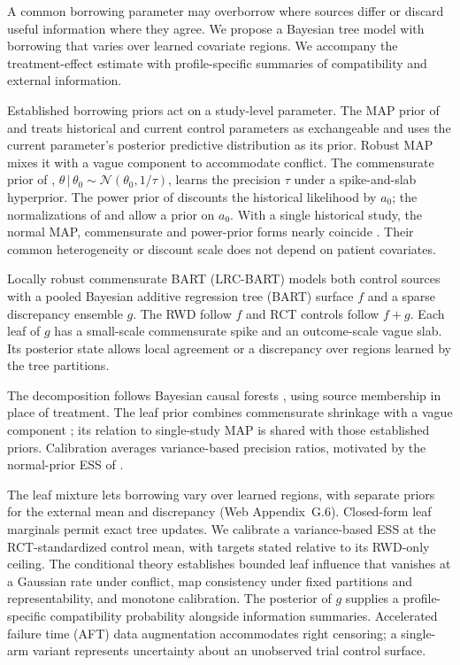 \documentclass[11pt]{article}
\newcommand{\Normal}{\mathcal{N}}
\newcommand{\given}{\,\vert\,}
\theoremstyle{definition}
\theoremstyle{plain}
\begin{document}
A common borrowing parameter may overborrow where sources differ or discard useful information where they agree. We propose a Bayesian tree model with borrowing that varies over learned covariate regions. We accompany the treatment-effect estimate with profile-specific summaries of compatibility and external information.

Established borrowing priors act on a study-level parameter. The MAP prior of \citet{Neuenschwander2010MAP} and \citet{schmidli2014robust} treats historical and current control parameters as exchangeable and uses the current parameter's posterior predictive distribution as its prior. Robust MAP mixes it with a vague component to accommodate conflict. The commensurate prior of \citet{Hobbs2011,Hobbs2012}, $\theta\given\theta_0\sim\Normal(\theta_0,1/\tau)$, learns the precision $\tau$ under a spike-and-slab hyperprior. The power prior of \citet{IbrahimChen2000} discounts the historical likelihood by $a_0$; the normalizations of \citet{Duan2006} and \citet{Neuenschwander2009PP} allow a prior on $a_0$. With a single historical study, the normal MAP, commensurate and power-prior forms nearly coincide \citep{RoverFriede2020,RoverFriede2025}. Their common heterogeneity or discount scale does not depend on patient covariates.

Locally robust commensurate BART (LRC-BART) models both control sources with a pooled Bayesian additive regression tree (BART) surface $f$ and a sparse discrepancy ensemble $g$. The RWD follow $f$ and RCT controls follow $f+g$. Each leaf of $g$ has a small-scale commensurate spike and an outcome-scale vague slab. Its posterior state allows local agreement or a discrepancy over regions learned by the tree partitions.

The decomposition follows Bayesian causal forests \citep{Hahn2020BCF}, using source membership in place of treatment. The leaf prior combines commensurate shrinkage \citep{Hobbs2011} with a vague component \citep{schmidli2014robust}; its relation to single-study MAP \citep{RoverFriede2025} is shared with those established priors. Calibration averages variance-based precision ratios, motivated by the normal-prior ESS of \citet{neuenschwander2020}.

The leaf mixture lets borrowing vary over learned regions, with separate priors for the external mean and discrepancy (Web Appendix~G.6). Closed-form leaf marginals permit exact tree updates. We calibrate a variance-based ESS at the RCT-standardized control mean, with targets stated relative to its RWD-only ceiling. The conditional theory establishes bounded leaf influence that vanishes at a Gaussian rate under conflict, map consistency under fixed partitions and representability, and monotone calibration. The posterior of $g$ supplies a profile-specific compatibility probability alongside information summaries. Accelerated failure time (AFT) data augmentation accommodates right censoring; a single-arm variant represents uncertainty about an unobserved trial control surface.
\end{document}
